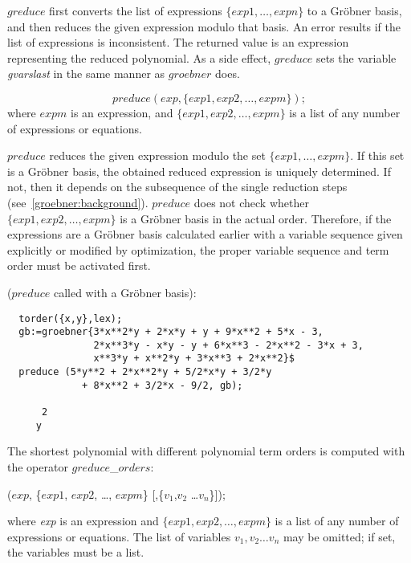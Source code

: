 $greduce$ first converts the list of expressions $\{exp1, \ldots ,
expn\}$ to a Gr\"obner basis, and then reduces the given expression
modulo that basis.  An error results if the list of expressions is
inconsistent. The returned value is an expression representing the
reduced polynomial. As a side effect, $greduce$ sets the variable {\it
gvarslast} in the same manner as $groebner$ does.

\[
 preduce(exp, \{exp1, exp2,\ldots , expm\});
\]
where $ expm $  is an expression, and $\{exp1, exp2, \ldots ,
expm \}$ is a list of any number of expressions or equations.

$preduce$ reduces the given expression modulo the set $\{exp1,
\ldots , expm\}$. If this set is a Gr\"obner basis, the obtained reduced
expression is uniquely determined. If not, then it depends on the
subsequence of the single reduction steps
(see~\ref{groebner:background}). $preduce$ does not check whether
$\{exp1, exp2, \ldots , expm\}$ is a Gr\"obner basis in the actual
order. Therefore, if the expressions are a Gr\"obner basis calculated
earlier with a variable sequence given explicitly or modified by
optimization, the proper variable sequence and term order must
be activated first.

\example ($preduce$ called with a Gr\"obner basis):
\begin{verbatim}
  torder({x,y},lex);
  gb:=groebner{3*x**2*y + 2*x*y + y + 9*x**2 + 5*x - 3,
               2*x**3*y - x*y - y + 6*x**3 - 2*x**2 - 3*x + 3,
               x**3*y + x**2*y + 3*x**3 + 2*x**2}$
  preduce (5*y**2 + 2*x**2*y + 5/2*x*y + 3/2*y
             + 8*x**2 + 3/2*x - 9/2, gb);

      2
     y
\end{verbatim}

The shortest polynomial with different polynomial term orders is computed
with the operator $greduce$\_$orders$:
 
\begin{description}
\item[{\it greduce\_orders}]($exp$, \{$exp1$, $exp2$, \ldots , $expm$\}
[,\{$v_1$,$v_2$ \ldots $v_n$\}]);

where {\it exp} is an expression and $\{exp1, exp2,\ldots , expm\}$ is
a list of any number of expressions or equations. The list of variables
$v_1,v_2 \ldots v_n$ may be omitted; if set, the variables must be a list.
\end{description}
 
